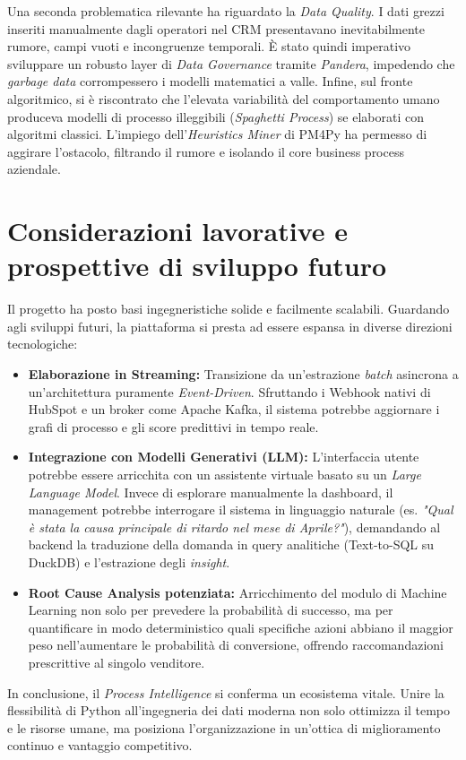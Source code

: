 \documentclass[12pt, a4paper]{report}
\begin{document}
Una seconda problematica rilevante ha riguardato la \textit{Data Quality}. I dati grezzi inseriti manualmente dagli operatori nel CRM presentavano inevitabilmente rumore, campi vuoti e incongruenze temporali. È stato quindi imperativo sviluppare un robusto layer di \textit{Data Governance} tramite \textit{Pandera}, impedendo che \textit{garbage data} corrompessero i modelli matematici a valle. 
Infine, sul fronte algoritmico, si è riscontrato che l'elevata variabilità del comportamento umano produceva modelli di processo illeggibili (\textit{Spaghetti Process}) se elaborati con algoritmi classici. L'impiego dell'\textit{Heuristics Miner} di PM4Py ha permesso di aggirare l'ostacolo, filtrando il rumore e isolando il core business process aziendale.

\section{Considerazioni lavorative e prospettive di sviluppo futuro}
Il progetto ha posto basi ingegneristiche solide e facilmente scalabili. Guardando agli sviluppi futuri, la piattaforma si presta ad essere espansa in diverse direzioni tecnologiche:
\begin{itemize}
    \item \textbf{Elaborazione in Streaming:} Transizione da un'estrazione \textit{batch} asincrona a un'architettura puramente \textit{Event-Driven}. Sfruttando i Webhook nativi di HubSpot e un broker come Apache Kafka, il sistema potrebbe aggiornare i grafi di processo e gli score predittivi in tempo reale.
    \item \textbf{Integrazione con Modelli Generativi (LLM):} L'interfaccia utente potrebbe essere arricchita con un assistente virtuale basato su un \textit{Large Language Model}. Invece di esplorare manualmente la dashboard, il management potrebbe interrogare il sistema in linguaggio naturale (es. \textit{"Qual è stata la causa principale di ritardo nel mese di Aprile?"}), demandando al backend la traduzione della domanda in query analitiche (Text-to-SQL su DuckDB) e l'estrazione degli \textit{insight}.
    \item \textbf{Root Cause Analysis potenziata:} Arricchimento del modulo di Machine Learning non solo per prevedere la probabilità di successo, ma per quantificare in modo deterministico quali specifiche azioni abbiano il maggior peso nell'aumentare le probabilità di conversione, offrendo raccomandazioni prescrittive al singolo venditore.
\end{itemize}

In conclusione, il \textit{Process Intelligence} si conferma un ecosistema vitale. Unire la flessibilità di Python all'ingegneria dei dati moderna non solo ottimizza il tempo e le risorse umane, ma posiziona l'organizzazione in un'ottica di miglioramento continuo e vantaggio competitivo.


\cleardoublepage
{}
\printbibliography[title={BIBLIOGRAFIA E SITOGRAFIA}]
\end{document}
